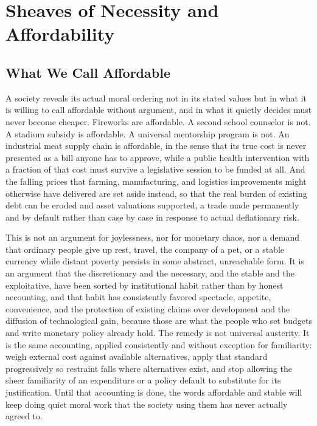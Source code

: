 
\chapter{Sheaves of Necessity and Affordability}
\label{ch:ch22-sheaves-of-necessity}
\section{What We Call Affordable}

A society reveals its actual moral ordering not in its stated values but in what it is willing to call affordable without argument, and in what it quietly decides must never become cheaper. Fireworks are affordable. A second school counselor is not. A stadium subsidy is affordable. A universal mentorship program is not. An industrial meat supply chain is affordable, in the sense that its true cost is never presented as a bill anyone has to approve, while a public health intervention with a fraction of that cost must survive a legislative session to be funded at all. And the falling prices that farming, manufacturing, and logistics improvements might otherwise have delivered are set aside instead, so that the real burden of existing debt can be eroded and asset valuations supported, a trade made permanently and by default rather than case by case in response to actual deflationary risk.

This is not an argument for joylessness, nor for monetary chaos, nor a demand that ordinary people give up rest, travel, the company of a pet, or a stable currency while distant poverty persists in some abstract, unreachable form. It is an argument that the discretionary and the necessary, and the stable and the exploitative, have been sorted by institutional habit rather than by honest accounting, and that habit has consistently favored spectacle, appetite, convenience, and the protection of existing claims over development and the diffusion of technological gain, because those are what the people who set budgets and write monetary policy already hold. The remedy is not universal austerity. It is the same accounting, applied consistently and without exception for familiarity: weigh external cost against available alternatives, apply that standard progressively so restraint falls where alternatives exist, and stop allowing the sheer familiarity of an expenditure or a policy default to substitute for its justification. Until that accounting is done, the words affordable and stable will keep doing quiet moral work that the society using them has never actually agreed to.

